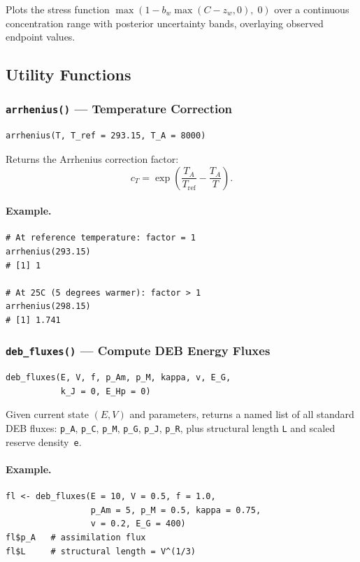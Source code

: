 \documentclass[11pt,a4paper]{article}
\newcommand{\fn}[1]{\texttt{#1()}}
\newcommand{\code}[1]{\texttt{#1}}
\begin{document}
Plots the stress function $\max(1 - b_w\max(C - z_w, 0),\; 0)$ over a
continuous concentration range with posterior uncertainty bands, overlaying
observed endpoint values.

\subsection{Utility Functions}

\subsubsection{\fn{arrhenius} --- Temperature Correction}

\begin{lstlisting}
arrhenius(T, T_ref = 293.15, T_A = 8000)
\end{lstlisting}

Returns the Arrhenius correction factor:
\begin{equation}
c_T = \exp\!\left(\frac{T_A}{T_{\text{ref}}} - \frac{T_A}{T}\right).
\end{equation}

\paragraph{Example.}
\begin{lstlisting}
# At reference temperature: factor = 1
arrhenius(293.15)
# [1] 1

# At 25C (5 degrees warmer): factor > 1
arrhenius(298.15)
# [1] 1.741
\end{lstlisting}

\subsubsection{\fn{deb\_fluxes} --- Compute DEB Energy Fluxes}

\begin{lstlisting}
deb_fluxes(E, V, f, p_Am, p_M, kappa, v, E_G,
           k_J = 0, E_Hp = 0)
\end{lstlisting}

Given current state $(E, V)$ and parameters, returns a named list of all
standard DEB fluxes: \code{p\_A}, \code{p\_C}, \code{p\_M}, \code{p\_G},
\code{p\_J}, \code{p\_R}, plus structural length \code{L} and scaled
reserve density~\code{e}.

\paragraph{Example.}
\begin{lstlisting}
fl <- deb_fluxes(E = 10, V = 0.5, f = 1.0,
                 p_Am = 5, p_M = 0.5, kappa = 0.75,
                 v = 0.2, E_G = 400)
fl$p_A   # assimilation flux
fl$L     # structural length = V^(1/3)
\end{lstlisting}
\end{document}
